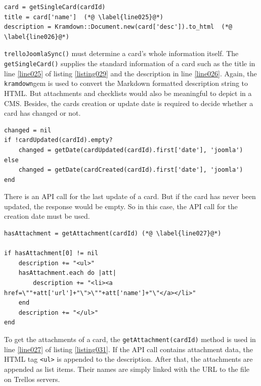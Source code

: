 \begin{lstlisting}[aboveskip=1\baselineskip, caption=Getting standard card information., label=listing029]
card = getSingleCard(cardId)
title = card['name']  (*@ \label{line025}@*)
description = Kramdown::Document.new(card['desc']).to_html  (*@ \label{line026}@*)
\end{lstlisting}

\lstinline{trelloJoomlaSync()} must determine a card's whole information itself. The \lstinline{getSingleCard()} supplies the standard information of a card such as the title in line \ref{line025} of listing \ref{listing029} and the description in line \ref{line026}. Again, the \texttt{kramdown}gem is used to convert the Markdown formatted description string to HTML. But attachments and checklists would also be meaningful to depict in a CMS. Besides, the cards creation or update date is required to decide whether a card has changed or not.

\begin{lstlisting}[aboveskip=1\baselineskip, caption=Getting the date of a cards last change., label=listing030]
changed = nil
if !cardUpdated(cardId).empty?
	changed = getDate(cardUpdated(cardId).first['date'], 'joomla')
else
	changed = getDate(cardCreated(cardId).first['date'], 'joomla')
end
\end{lstlisting}
There is an API call for the last update of a card. But if the card has never been updated, the response would be empty. So in this case, the API call for the creation date must be used.

\begin{lstlisting}[aboveskip=1\baselineskip, caption=Processing the attachments of a card., label=listing031]
hasAttachment = getAttachment(cardId) (*@ \label{line027}@*)

if hasAttachment[0] != nil
	description += "<ul>"		
	hasAttachment.each do |att|	
		description += "<li><a href=\""+att['url']+"\">\""+att['name']+"\"</a></li>"
	end
	description += "</ul>"
end
\end{lstlisting}

To get the attachments of a card, the \lstinline{getAttachment(cardId)} method is used in line \ref{line027} of listing \ref{listing031}. If the API call contains attachment data, the HTML tag \lstinline{<ul>} is appended to the description. After that, the attachments are appended as list items. Their names are simply linked with the URL to the file on Trellos servers.  

